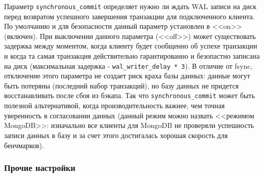 Параметр \lstinline!synchronous_commit! определяет нужно ли ждать WAL записи на диск перед возвратом успешного завершения транзакции для подключенного клиента. По умолчанию и для безопасности данный параметр установлен в <<on>> (включен). При выключении данного параметра (<<off>>) может существовать задержка между моментом, когда клиенту будет сообщенно об успехе транзакции и когда та самая транзакция действительно гарантированно и безопастно записана на диск (максимальная задержка - \lstinline!wal_writer_delay * 3!). В отличие от fsync, отключение этого параметра не создает риск краха базы данных: данные могут быть потеряны (последний набор транзакций), но базу данных не придется восстанавливать после сбоя из бэкапа. Так что \lstinline!synchronous_commit! может быть полезной альтернативой, когда производительность важнее, чем точная уверенность в согласовании данных (данный режим можно назвать <<режимом MongoDB>>: изначально все клиенты для MongoDB не проверяли успешность записи данных в базу и за счет этого достигалась хорошая скорость для бенчмарков).


\subsubsection{Прочие настройки}


